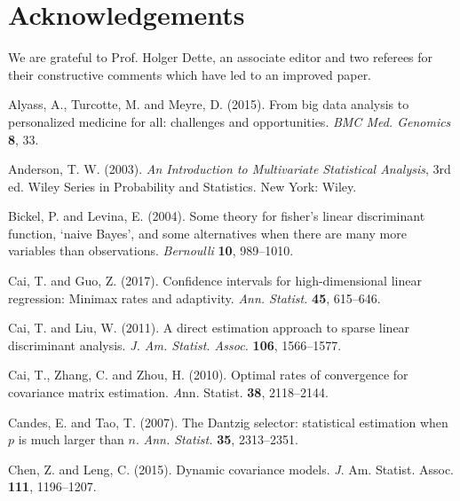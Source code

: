 \documentclass[11pt]{article}
\theoremstyle{definition}
\begin{document}
 \section*{Acknowledgements}
 We are grateful to Prof. Holger Dette, an associate editor and two referees for their constructive comments which have led to an improved paper.
 
 
 
 \begin{thebibliography}{}
 	
 	
 	
 	{Alyass, A.}, {Turcotte, M.} and {Meyre, D.} (2015). From big data analysis to personalized medicine
 	for all: challenges and opportunities.
 	{\it BMC Med. Genomics} {\bf 8}, 33.
 	
 	
 	{Anderson, T. W.}  (2003).
 	\textit{An Introduction to Multivariate
 		Statistical Analysis}, 3rd ed. Wiley Series in Probability and
 	Statistics. New York: Wiley.
 	
 	
 	{Bickel, P.} and {Levina, E.} (2004).
 	{Some theory
 		for fisher's linear discriminant function, `naive Bayes', and some
 		alternatives when there are many more variables than observations.}
 	\textit{Bernoulli} {\bf 10}, 989--1010.
 	
 	{Cai, T.}  and {Guo, Z.} (2017).
 	{Confidence intervals for high-dimensional linear regression: Minimax rates and adaptivity.}
 	\textit{Ann. Statist.} {\bf 45}, 615--646.
 	
 	
 	{Cai, T.} and {Liu, W.} (2011).
 	{A direct
 		estimation approach to sparse linear discriminant analysis.}
 	\textit{J. Am. Statist. Assoc.} {\bf 106}, 1566--1577.
 	
 	{Cai, T., Zhang, C.} and {Zhou, H.} (2010). {Optimal rates of convergence for covariance matrix estimation.}
 	{\textit Ann. Statist.} {\bf 38}, 2118--2144.
 	
 	
 	{Candes, E.} and {Tao, T.} (2007).  
 	{The Dantzig
 		selector: statistical estimation when $p$ is much larger than $n$.}
 	\textit{Ann. Statist.}
 	{\bf 35}, 2313--2351.
 	
 	{ Chen, Z.} and {Leng, C.} (2015).
 	{Dynamic covariance models}.
 	{\textit J. Am. Statist. Assoc.} {\bf 111}, 1196--1207.
 	

\end{thebibliography}
\end{document}
